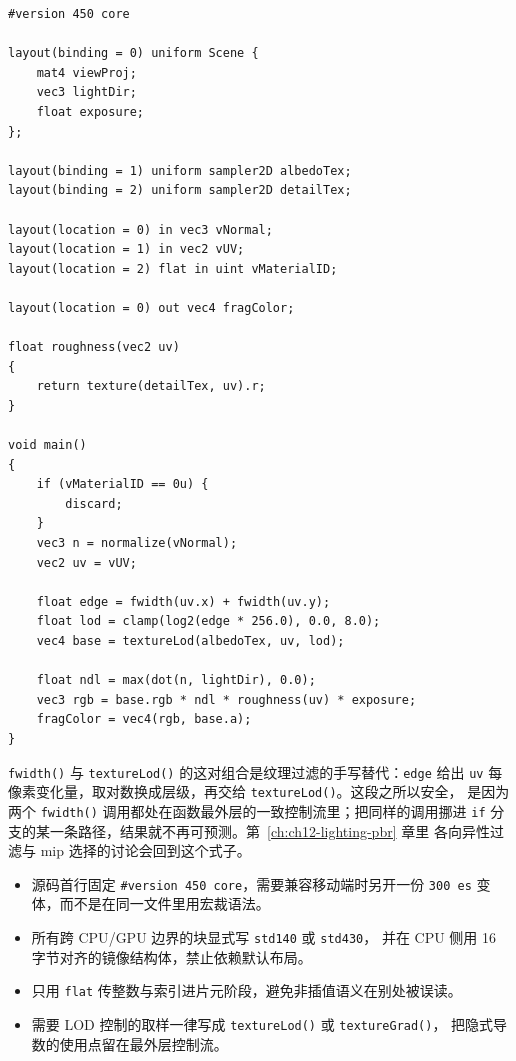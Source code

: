 \documentclass[12pt,a4paper,fontset=fandol]{ctexbook}
\newcommand{\Fn}[1]{\texttt{#1()}}
\newcommand{\Tp}[1]{\texttt{#1}}
\newcommand{\Bk}{\discretionary{}{}{}}
\newcommand{\Lang}[1]{\textsf{#1}}
\newcommand{\DomCPU}{\Lang{CPU}}
\newcommand{\DomGPU}{\Lang{GPU}}
\newcommand{\GSL}{\Lang{GLSL}}
\begin{document}
\begin{lstlisting}[style=glslstyle,caption={结构完整的片元着色器：UBO 提供参数，textureLod 与 fwidth 决定取样层级},label={lst:ch05-frag}]
#version 450 core

layout(binding = 0) uniform Scene {
    mat4 viewProj;
    vec3 lightDir;
    float exposure;
};

layout(binding = 1) uniform sampler2D albedoTex;
layout(binding = 2) uniform sampler2D detailTex;

layout(location = 0) in vec3 vNormal;
layout(location = 1) in vec2 vUV;
layout(location = 2) flat in uint vMaterialID;

layout(location = 0) out vec4 fragColor;

float roughness(vec2 uv)
{
    return texture(detailTex, uv).r;
}

void main()
{
    if (vMaterialID == 0u) {
        discard;
    }
    vec3 n = normalize(vNormal);
    vec2 uv = vUV;

    float edge = fwidth(uv.x) + fwidth(uv.y);
    float lod = clamp(log2(edge * 256.0), 0.0, 8.0);
    vec4 base = textureLod(albedoTex, uv, lod);

    float ndl = max(dot(n, lightDir), 0.0);
    vec3 rgb = base.rgb * ndl * roughness(uv) * exposure;
    fragColor = vec4(rgb, base.a);
}
\end{lstlisting}

\Fn{fwidth} 与 \Fn{textureLod} 的这对组合是纹理过滤的手写替代：\Tp{edge} 给出
\Tp{uv} 每像素变化量，取对数换成层级，再交给 \Fn{textureLod}。这段之所以安全，
是因为两个 \Fn{fwidth} 调用都处在函数最外层的一致控制流里；把同样的调用挪进
\Tp{if} 分支的某一条路径，结果就不再可预测。第~\ref{ch:ch12-lighting-pbr} 章里
各向异性过滤与 mip 选择的讨论会回到这个式子。

\begin{bestpractice}[title={写 \GSL{} 之前的四条落地约定}]
\begin{itemize}
\item 源码首行固定 \Tp{\#version 450 core}，需要兼容移动端时另开一份
\Tp{300 es} 变体，而不是在同一文件里用宏裁语法。
\item 所有跨 \DomCPU{}/{\Bk}\DomGPU{} 边界的块显式写 \Tp{std140} 或 \Tp{std430}，
并在 \DomCPU{} 侧用 16 字节对齐的镜像结构体，禁止依赖默认布局。
\item 只用 \Tp{flat} 传整数与索引进片元阶段，避免非插值语义在别处被误读。
\item 需要 LOD 控制的取样一律写成 \Fn{textureLod} 或 \Fn{textureGrad}，
把隐式导数的使用点留在最外层控制流。
\end{itemize}
\end{bestpractice}
\end{document}
